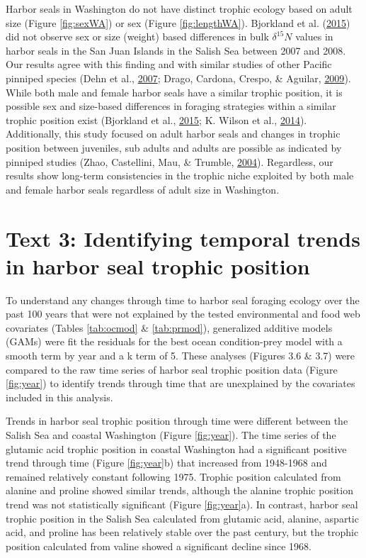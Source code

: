 \documentclass [11pt, proquest] {uwthesis}[2015/03/03]
\begin{document}
Harbor seals in Washington do not have distinct trophic ecology based on
adult size (Figure \ref{fig:sexWA}) or sex (Figure \ref{fig:lengthWA}).
Bjorkland et al. (\protect\hyperlink{ref-Bjorkland2015}{2015}) did not
observe sex or size (weight) based differences in bulk \(\delta^{15}N\)
values in harbor seals in the San Juan Islands in the Salish Sea between
2007 and 2008. Our results agree with this finding and with similar
studies of other Pacific pinniped species (Dehn et al.,
\protect\hyperlink{ref-Dehn2007}{2007}; Drago, Cardona, Crespo, \&
Aguilar, \protect\hyperlink{ref-Drago2009}{2009}). While both male and
female harbor seals have a similar trophic position, it is possible sex
and size-based differences in foraging strategies within a similar
trophic position exist (Bjorkland et al.,
\protect\hyperlink{ref-Bjorkland2015}{2015}; K. Wilson et al.,
\protect\hyperlink{ref-Wilson2014}{2014}). Additionally, this study
focused on adult harbor seals and changes in trophic position between
juveniles, sub adults and adults are possible as indicated by pinniped
studies (Zhao, Castellini, Mau, \& Trumble,
\protect\hyperlink{ref-Zhao2004}{2004}). Regardless, our results show
long-term consistencies in the trophic niche exploited by both male and
female harbor seals regardless of adult size in Washington.

\section{Text 3: Identifying temporal trends in harbor seal trophic
position}\label{text-3-identifying-temporal-trends-in-harbor-seal-trophic-position}

To understand any changes through time to harbor seal foraging ecology
over the past 100 years that were not explained by the tested
environmental and food web covariates (Tables \ref{tab:ocmod} \&
\ref{tab:prmod}), generalized additive models (GAMs) were fit the
residuals for the best ocean condition-prey model with a smooth term by
year and a k term of 5. These analyses (Figures 3.6 \& 3.7) were
compared to the raw time series of harbor seal trophic position data
(Figure \ref{fig:year}) to identify trends through time that are
unexplained by the covariates included in this analysis.

Trends in harbor seal trophic position through time were different
between the Salish Sea and coastal Washington (Figure \ref{fig:year}).
The time series of the glutamic acid trophic position in coastal
Washington had a significant positive trend through time (Figure
\ref{fig:year}b) that increased from 1948-1968 and remained relatively
constant following 1975. Trophic position calculated from alanine and
proline showed similar trends, although the alanine trophic position
trend was not statistically significant (Figure \ref{fig:year}a). In
contrast, harbor seal trophic position in the Salish Sea calculated from
glutamic acid, alanine, aspartic acid, and proline has been relatively
stable over the past century, but the trophic position calculated from
valine showed a significant decline since 1968.
\end{document}
